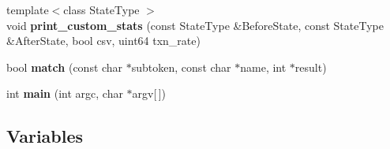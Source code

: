 \begin{DoxyCompactItemize}
{\footnotesize template$<$class State\+Type $>$ }\\void {\bfseries print\+\_\+custom\+\_\+stats} (const State\+Type \&Before\+State, const State\+Type \&After\+State, bool csv, uint64 txn\+\_\+rate)
\item 
\mbox{\label{pcm-core_8cpp_a85a63bb4533f6b95cdd9a2287323e50e}} 
bool {\bfseries match} (const char $\ast$subtoken, const char $\ast$name, int $\ast$result)
\item 
\mbox{\label{pcm-core_8cpp_a0ddf1224851353fc92bfbff6f499fa97}} 
int {\bfseries main} (int argc, char $\ast$argv\mbox{[}$\,$\mbox{]})
\end{DoxyCompactItemize}
\subsection*{Variables}
